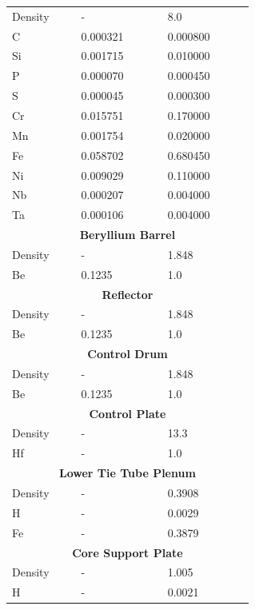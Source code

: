 \documentclass[8pt,a5paper]{article}
\begin{document}
\begin{longtable}{|m{0.2\linewidth}|m{0.25\linewidth}|m{0.25\linewidth}|}
    \hline
    \endlastfoot
    \multicolumn{3}{|c|}{\textbf{Steel Wrapper (SS-347)}}\\\hline
    Density & - & \SI{8.0}{} \\
    C & \SI{0.000321}{} & \SI{0.000800}{} \\
    Si & \SI{0.001715}{} & \SI{0.010000}{} \\
    P & \SI{0.000070}{} & \SI{0.000450}{} \\
    S & \SI{0.000045}{} & \SI{0.000300}{} \\
    Cr & \SI{0.015751}{} & \SI{0.170000}{} \\
    Mn & \SI{0.001754}{} & \SI{0.020000}{} \\
    Fe & \SI{0.058702}{} & \SI{0.680450}{} \\
    Ni & \SI{0.009029}{} & \SI{0.110000}{} \\
    Nb & \SI{0.000207}{} & \SI{0.004000}{} \\
    Ta & \SI{0.000106}{} & \SI{0.004000}{} \\\hline
    \multicolumn{3}{|c|}{\textbf{Beryllium Barrel}}\\\hline
    Density & - & \SI{1.848}{} \\
    Be & \SI{0.1235}{} & \SI{1.0}{} \\\hline
    \multicolumn{3}{|c|}{\textbf{Reflector}}\\\hline
    Density & - & \SI{1.848}{} \\
    Be & \SI{0.1235}{} & \SI{1.0}{} \\\hline
    \multicolumn{3}{|c|}{\textbf{Control Drum}}\\\hline
    Density & - & \SI{1.848}{} \\
    Be & \SI{0.1235}{} & \SI{1.0}{} \\\hline
    \multicolumn{3}{|c|}{\textbf{Control Plate}}\\\hline
    Density & - & \SI{13.3}{} \\
    Hf & - & \SI{1.0}{} \\\hline
    \multicolumn{3}{|c|}{\textbf{Lower Tie Tube Plenum}}\\\hline
    Density & - & \SI{0.3908}{} \\
    H & - & \SI{0.0029}{} \\
    Fe & - & \SI{0.3879}{} \\\hline
    \multicolumn{3}{|c|}{\textbf{Core Support Plate}}\\\hline
    Density & - & \SI{1.005}{} \\
    H & - & \SI{0.0021}{} \\

\end{longtable}
\end{document}
